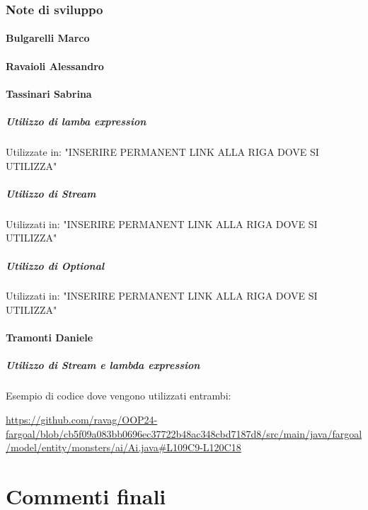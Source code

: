 \documentclass{report}
\begin{document}
\subsection{Note di sviluppo}

\subsubsection{Bulgarelli Marco}

\subsubsection{Ravaioli Alessandro}

\subsubsection{Tassinari Sabrina}
\paragraph{Utilizzo di lamba expression}
Utilizzate in: "INSERIRE PERMANENT LINK ALLA RIGA DOVE SI UTILIZZA"

\paragraph{Utilizzo di Stream}
Utilizzati in: "INSERIRE PERMANENT LINK ALLA RIGA DOVE SI UTILIZZA"

\paragraph{Utilizzo di Optional}
Utilizzati in: "INSERIRE PERMANENT LINK ALLA RIGA DOVE SI UTILIZZA"

\subsubsection{Tramonti Daniele}
\paragraph{Utilizzo di Stream e lambda expression}
Esempio di codice dove vengono utilizzati entrambi:
\begin{sloppypar}
\url{https://github.com/ravag/OOP24-fargoal/blob/cb5f09a083bb0696ec37722b48ac348cbd7187d8/src/main/java/fargoal/model/entity/monsters/ai/Ai.java#L109C9-L120C18}
\end{sloppypar}

\chapter{Commenti finali}
\end{document}
